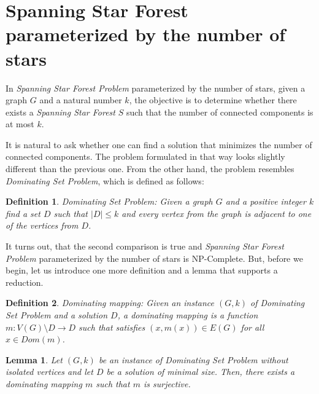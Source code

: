 \documentclass[en]{pracamgr}
\newtheorem{defi}{Definition}
\newtheorem{lemma}{Lemma}
\newcommand{\ssf}{\emph{Spanning Star Forest}}
\newcommand{\domsetp}{\emph{Dominating Set Problem}}
\newcommand{\kssf}{\emph{Spanning Star Forest Problem} parameterized by the number of stars}
\begin{document}
\section{Spanning Star Forest parameterized by the number of stars}

In \kssf{}, given a graph $G$ and a natural number $k$, the objective is to determine whether there exists a \ssf{} $S$ such that the number of connected components is at most $k$.

It is natural to ask whether one can find a solution that minimizes the number of connected components. The problem formulated in that way looks slightly different than the previous one. From the other hand, the problem resembles \domsetp{}, which is defined as follows:

\begin{defi}
	\domsetp: Given a graph $G$ and a positive integer $k$ find a set $D$ such that $|D| \leq k$ and every vertex from the graph is adjacent to one of the vertices from $D$.
\end{defi}

It turns out, that the second comparison is true and \kssf{} is NP-Complete. But, before we begin, let us introduce one more definition and a lemma that supports a reduction.

\begin{defi}
	Dominating mapping: Given an instance $(G,k)$ of Dominating Set Problem and a solution $D$, a dominating mapping is a function $m:V(G) \setminus D \rightarrow D$ such that satisfies $(x,m(x)) \in E(G)$ for all $x \in Dom(m)$.
\end{defi}

\begin{lemma}\label{dom mapping}
	Let $(G,k)$ be an instance of \domsetp{} without isolated vertices and let $D$ be a solution of minimal size. Then, there exists a dominating mapping $m$ such that $m$ is surjective.
\end{lemma}
\end{document}
